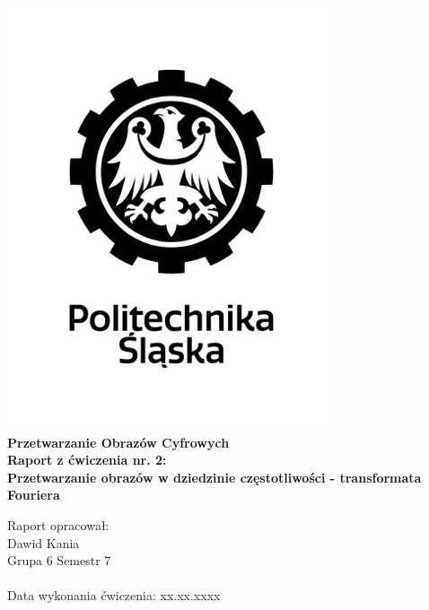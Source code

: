 
\begin{titlepage}
    \begin{center}
        \includegraphics[width=.50\linewidth]{other/polsl.png}\\
        \Huge
        \textbf{Przetwarzanie Obrazów Cyfrowych}
        \\ \vspace{1.5cm}
        \Large
        \textbf{Raport z ćwiczenia nr. 2: } \\
        \textbf{Przetwarzanie obrazów w dziedzinie częstotliwości - transformata Fouriera}        
    \end{center}
    \vspace{2.5cm}
    \Large
    Raport opracował: \\
    Dawid Kania \\
    Grupa 6 Semestr 7 \\ \\
    Data wykonania ćwiczenia: xx.xx.xxxx
\end{titlepage}
